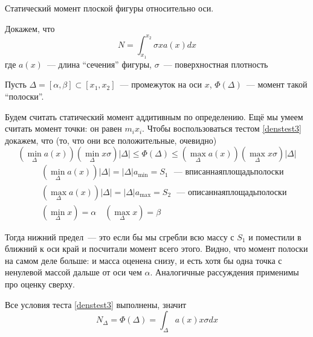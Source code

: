\documentclass{article}
\newcommand{\emdash}{---}
\newcommand{\nocomma}{}
{\theorembodyfont{\rmfamily}\newtheorem{example}{\CYRP\cyrr\cyri\cyrm\cyre\cyrr}}
\begin{document}
\begin{example}
  Статический момент плоской фигуры
  относительно оси.
  
  Докажем, что
  \[ N = \int_{x_1}^{x_2} \sigma xa \left( x \right) d \nocomma x \]
  где $a \left( x \right)$~{\emdash} длина ``сечения''
  фигуры, $\sigma$~{\emdash} поверхностная
  плотность
  
  Пусть $\Delta = \left[ \alpha, \beta \right] \subset \left[ x_1, x_2
  \right]$~{\emdash} промежуток на оси $x$, $\Phi \left( \Delta
  \right)$~{\emdash} момент такой ``полоски''.
  
  Будем считать статический момент
  аддитивным по определению. Ещё мы умеем
  считать момент точки: он равен $m_i x_i$.
  Чтобы воспользоваться тестом \ref{denstest3}
  докажем, что (то, что они все
  положительные, очевидно)
  \[ \left( \min_{\Delta} a \left( x \right) \right)  \left( \min_{\Delta} x
     \sigma \right)  \left| \Delta \right| \leqslant \Phi \left( \Delta
     \right) \leqslant \left( \max_{\Delta} a \left( x \right) \right)  \left(
     \max_{\Delta} x \sigma \right) \left| \Delta \right| \]
  \begin{eqnarray*}
    &  & \left( \min_{\Delta} a \left( x \right) \right)  \left| \Delta
    \right| = \left| \Delta \right| a_{\min} = S_1 \text{~ \emdash
    вписаннаяплощадьполоски}\\
    &  & \left( \max_{\Delta} a \left( x \right) \right)  \left| \Delta
    \right| = \left| \Delta \right| a_{\max} = S_2 \text{~ \emdash
    описаннаяплощадьполоски}\\
    &  & \left( \min_{\Delta} x \right) = \alpha \hspace{1em}  \left(
    \max_{\Delta} x \right) = \beta
  \end{eqnarray*}
  
  
  Тогда нижний предел~{\emdash} это если бы мы
  сгребли всю массу с $S_1$ и поместили в
  ближний к оси край и посчитали момент
  всего этого. Видно, что момент полоски на
  самом деле больше: и масса оценена снизу,
  и есть хотя бы одна точка с ненулевой
  массой дальше от оси чем $\alpha$.
  Аналогичные рассуждения применимы про
  оценку сверху.
  
  Все условия теста \ref{denstest3} выполнены,
  значит
  \[ N_{\Delta} = \Phi \left( \Delta \right) = \int_{\Delta} a \left( x
     \right) x \sigma d \nocomma x \]
\end{example}
\end{document}
